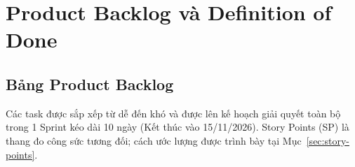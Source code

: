 \clearpage
\section{Product Backlog và Definition of Done}

\subsection{Bảng Product Backlog}
\label{sec:product-backlog}

Các task được sắp xếp từ dễ đến khó và được lên kế hoạch giải quyết toàn bộ trong 1 Sprint kéo dài 10 ngày (Kết thúc vào 15/11/2026).
Story Points (SP) là thang đo công sức tương đối; cách ước lượng được trình bày
tại Mục~\ref{sec:story-points}.

\newcommand{\code}[1]{\texttt{#1}}

